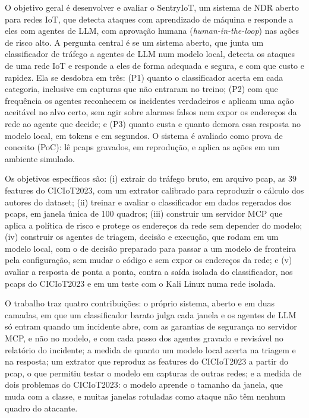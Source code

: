 O objetivo geral é desenvolver e avaliar o SentryIoT, um sistema de NDR aberto para redes IoT, que detecta ataques com aprendizado de máquina e responde a eles com agentes de LLM, com aprovação humana (\textit{human-in-the-loop}) nas ações de risco alto. A pergunta central é se um sistema aberto, que junta um classificador de tráfego a agentes de LLM num modelo local, detecta os ataques de uma rede IoT e responde a eles de forma adequada e segura, e com que custo e rapidez. Ela se desdobra em três: (P1) quanto o classificador acerta em cada categoria, inclusive em capturas que não entraram no treino; (P2) com que frequência os agentes reconhecem os incidentes verdadeiros e aplicam uma ação aceitável no alvo certo, sem agir sobre alarmes falsos nem expor os endereços da rede ao agente que decide; e (P3) quanto custa e quanto demora essa resposta no modelo local, em tokens e em segundos. O sistema é avaliado como prova de conceito (PoC): lê pcaps gravados, em reprodução, e aplica as ações em um ambiente simulado.

Os objetivos específicos são: (i) extrair do tráfego bruto, em arquivo pcap, as 39 features do CICIoT2023, com um extrator calibrado para reproduzir o cálculo dos autores do dataset; (ii) treinar e avaliar o classificador em dados regerados dos pcaps, em janela única de 100 quadros; (iii) construir um servidor MCP que aplica a política de risco e protege os endereços da rede sem depender do modelo; (iv) construir os agentes de triagem, decisão e execução, que rodam em um modelo local, com o de decisão preparado para passar a um modelo de fronteira pela configuração, sem mudar o código e sem expor os endereços da rede; e (v) avaliar a resposta de ponta a ponta, contra a saída isolada do classificador, nos pcaps do CICIoT2023 e em um teste com o Kali Linux numa rede isolada.

O trabalho traz quatro contribuições: o próprio sistema, aberto e em duas camadas, em que um classificador barato julga cada janela e os agentes de LLM só entram quando um incidente abre, com as garantias de segurança no servidor MCP, e não no modelo, e com cada passo dos agentes gravado e revisável no relatório do incidente; a medida de quanto um modelo local acerta na triagem e na resposta; um extrator que reproduz as features do CICIoT2023 a partir do pcap, o que permitiu testar o modelo em capturas de outras redes; e a medida de dois problemas do CICIoT2023: o modelo aprende o tamanho da janela, que muda com a classe, e muitas janelas rotuladas como ataque não têm nenhum quadro do atacante.
